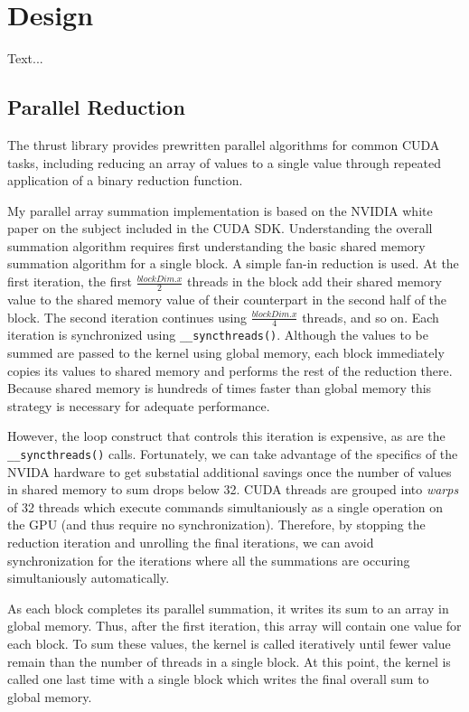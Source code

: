 \documentclass{article}
\begin{document}
\section{Design}
Text...
\subsection{Parallel Reduction}
The thrust library provides prewritten parallel algorithms for common CUDA tasks, including reducing an array of values to a single value through repeated application of a binary reduction function.\cite{thrust}

My parallel array summation implementation is based on the NVIDIA white paper on the subject included in the CUDA SDK.\cite{oprc} Understanding the overall summation algorithm requires first understanding the basic shared memory summation algorithm for a single block. A simple fan-in reduction is used. At the first iteration, the first \(\frac{blockDim.x}{2}\) threads in the block add their shared memory value to the shared memory value of their counterpart in the second half of the block. The second iteration continues using \(\frac{blockDim.x}{4}\) threads, and so on. Each iteration is synchronized using \verb!__syncthreads()!. Although the values to be summed are passed to the kernel using global memory, each block immediately copies its values to shared memory and performs the rest of the reduction there. Because shared memory is hundreds of times faster than global memory\cite{tutorial1} this strategy is necessary for adequate performance.

However, the loop construct that controls this iteration is expensive, as are the \verb!__syncthreads()! calls. Fortunately, we can take advantage of the specifics of the NVIDA hardware to get substatial additional savings once the number of values in shared memory to sum drops below 32. CUDA threads are grouped into \emph{warps} of 32 threads which execute commands simultaniously as a single operation on the GPU (and thus require no synchronization). Therefore, by stopping the reduction iteration and unrolling the final iterations, we can avoid synchronization for the iterations where all the summations are occuring simultaniously automatically.

As each block completes its parallel summation, it writes its sum to an array in global memory. Thus, after the first iteration, this array will contain one value for each block. To sum these values, the kernel is called iteratively until fewer value remain than the number of threads in a single block. At this point, the kernel is called one last time with a single block which writes the final overall sum to global memory.
\end{document}
